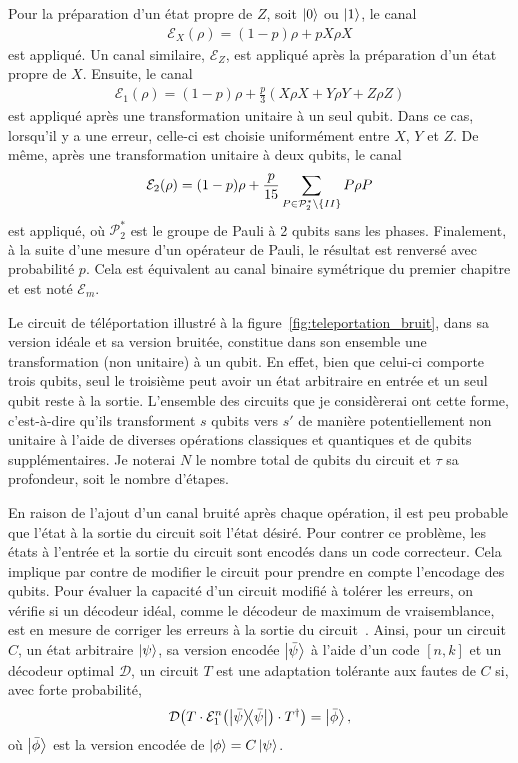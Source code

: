 Pour la préparation d'un état propre de $Z$, soit $\ket 0$ ou $\ket 1$,
le canal 
\begin{align}
\mathcal E_X(\rho) = (1 - p)\rho + pX\rho X
\end{align}
est appliqué.
Un canal similaire, $\mathcal E_Z$, est appliqué après la préparation
d'un état propre de $X$.
Ensuite,
le canal
\begin{align}
	\mathcal E_1(\rho) = (1 - p)\rho + \frac{p}{3}(X\rho X + Y\rho Y + Z\rho Z)
\end{align}
est appliqué après une transformation unitaire à un seul qubit.
Dans ce cas,
lorsqu'il y a une erreur,
celle-ci est choisie uniformément entre $X$, $Y$ et $Z$.
De même,
après une transformation unitaire à deux qubits,
le canal
\begin{align}
	\mathcal E_2(\rho)
	= (1 - p)\rho
	+ \frac{p}{15}\sum_{P \in \mathcal P_2^*\setminus \qty{II}} P\rho P
\end{align}
est appliqué,
où $\mathcal P_2^*$ est le groupe de Pauli à 2 qubits sans les phases.
Finalement,
à la suite d'une mesure d'un opérateur de Pauli,
le résultat est renversé avec probabilité $p$.
Cela est équivalent au canal binaire symétrique du premier chapitre
et est noté $\mathcal E_m$.

Le circuit de téléportation illustré à la figure~\ref{fig:teleportation_bruit},
dans sa version idéale et sa version bruitée,
constitue dans son ensemble une transformation (non unitaire) à un qubit.
En effet,
bien que celui-ci comporte trois qubits,
seul le troisième peut avoir un état arbitraire en entrée et un seul qubit reste à la sortie.
L'ensemble des circuits que je considèrerai ont cette forme,
c'est-à-dire qu'ils transforment $s$ qubits vers $s'$ de manière 
potentiellement non unitaire à l'aide de diverses opérations classiques et quantiques
et de qubits supplémentaires.
Je noterai $N$ le nombre total de qubits du circuit et $\tau$
sa profondeur, soit le nombre d'étapes. 

En raison de l'ajout d'un canal bruité après chaque opération,
il est peu probable que l'état à la sortie du circuit soit l'état désiré.
Pour contrer ce problème,
les états à l'entrée et la sortie du circuit sont encodés dans un code correcteur.
Cela implique par contre de modifier le circuit pour prendre en compte l'encodage des qubits.
Pour évaluer la capacité d'un circuit modifié à tolérer les erreurs,
on vérifie si un décodeur idéal, comme le décodeur de maximum de vraisemblance, est en 
mesure de corriger les erreurs à la sortie du circuit~\cite{gottesman_introduction_2009}.
Ainsi,
pour un circuit $C$,
un état arbitraire $\ket{\psi}$,
sa version encodée $\ket{\bar{\psi}}$ à l'aide d'un code $[n, k]$
et un décodeur optimal $\mathcal D$,
un circuit $T$ est une adaptation tolérante aux fautes de $C$ si,
avec forte probabilité,
\begin{align}
	\mathcal D\qty(T \cdot \mathcal E_1^{n}\qty(\op{\bar \psi}) \cdot T^{\dag})
	= \ket{\bar \phi},
	\label{eq:tol_faute_condition}
\end{align}
où $\ket{\bar \phi}$ est la version encodée de $\ket{\phi} = C \ket\psi$.

